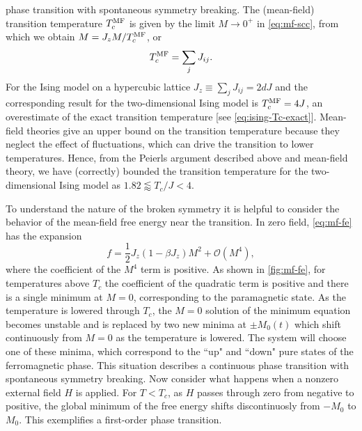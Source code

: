 phase transition with spontaneous symmetry breaking. The (mean-field)
transition temperature $T_c^{\mathrm{MF}}$ is given by the limit $M \to 0^+$ in
\cref{eq:mf-scc}, from which we obtain $M = J_z M / T_c^{\mathrm{MF}}$, or
\begin{equation}
  T_c^{\mathrm{MF}} = \sum_j J_{ij}.
\end{equation}
For the Ising model on a hypercubic lattice $J_z \equiv \sum_j J_{ij} = 2 d J$
and the corresponding result for the two-dimensional Ising model is $T_c^{\mathrm{MF}}=4J$,
an overestimate of the exact transition temperature [see
\cref{eq:ising-Tc-exact}]. Mean-field theories give an upper bound on the
transition temperature because they neglect the effect of fluctuations, which
can drive the transition to lower temperatures. Hence, from the Peierls
argument described above and mean-field theory, we have (correctly) bounded the
transition temperature for the two-dimensional Ising model as $1.82 \lessapprox
T_c/J < 4$.

To understand the nature of the broken symmetry it is helpful to consider the
behavior of the mean-field free energy near the transition. In zero field,
\cref{eq:mf-fe} has the expansion
\begin{equation}
  f = \frac{1}{2} J_z (1 - \beta J_z) M^2 + \mathcal{O}(M^4),
  \label{eq:mf-fe-trunc}
\end{equation}
where the coefficient of the $M^4$ term is positive. As shown in
\cref{fig:mf-fe}, for temperatures above $T_c$ the coefficient of the
quadratic term is positive and there is a single minimum at $M=0$,
corresponding to the paramagnetic state. As the temperature is lowered through
$T_c$, the $M=0$ solution of the minimum equation becomes unstable and is
replaced by two new minima at $\pm M_0(t)$ which shift continuously from $M=0$
as the temperature is lowered. The system will choose one of these minima,
which correspond to the ``up" and ``down" pure states of the ferromagnetic
phase. This situation describes a continuous phase transition with spontaneous
symmetry breaking. Now consider what happens when a nonzero external field $H$
is applied. For $T<T_c$, as $H$ passes through zero from negative to positive,
the global minimum of the free energy shifts discontinuosly from $-M_0$ to
$M_0$. This exemplifies a first-order phase transition.

